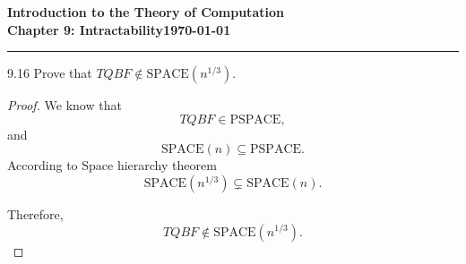 \documentclass[11pt]{article}
\newcommand{\dated}{\today}
\begin{document}
\textbf{Introduction to the Theory of
Computation}\hfill\textbf{\myname}\\[0.01in]
\textbf{Chapter 9: Intractability}\hfill\textbf{\dated}\\
\smallskip\hrule\bigskip

\begin{problem}{9.16}
Prove that $TQBF \notin \text{SPACE}(n^{1/3})$.
\end{problem}

\begin{proof}
We know that
\[
TQBF \in \text{PSPACE},
\]
and
\[
\text{SPACE}(n) \subseteq \text{PSPACE}.
\]
According to Space hierarchy theorem
\[
\text{SPACE}(n^{1/3}) \subsetneq \text{SPACE}(n).
\]

Therefore,
\[
TQBF \notin \text{SPACE}(n^{1/3}).
\]
\end{proof}
\end{document}
